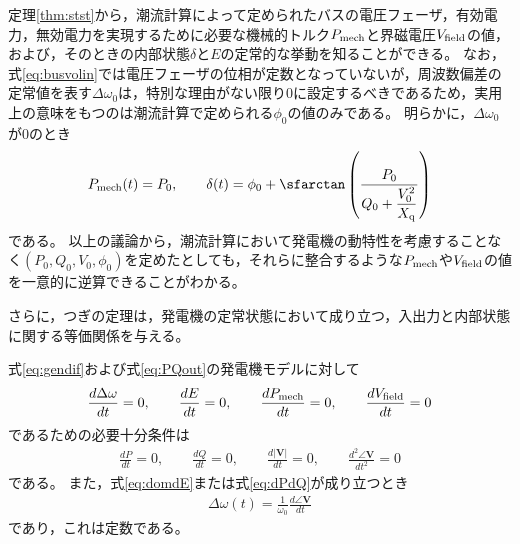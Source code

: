 \documentclass[tombow,dvipdfmx]{corona-a5}
\begin{document}
定理\ref{thm:stst}から，潮流計算によって定められたバスの電圧フェーザ，有効電力，無効電力を実現するために必要な機械的トルク$P_{\rm mech}$と界磁電圧$V_{\rm field}$の値，および，そのときの内部状態$\delta$と$E$の定常的な挙動を知ることができる。
なお，式\ref{eq:busvolin}では電圧フェーザの位相が定数となっていないが，周波数偏差の定常値を表す$\Delta \omega_0$は，特別な理由がない限り0に設定するべきであるため，実用上の意味をもつのは潮流計算で定められる$\phi_0$の値のみである。
明らかに，$\Delta \omega_0$が0のとき
\begin{align*}
P_{{\rm mech}}(t) =    P_0,\qquad
\delta (t)  = \phi_0
+ \sfarctan \left( \frac{P_0}{Q_0 + \frac{ V_0^2}{X_{\rm q}} } \right)
\end{align*}
である。
以上の議論から，潮流計算において発電機の動特性を考慮することなく$(P_0,Q_0,V_0,\phi_0)$を定めたとしても，それらに整合するような$P_{\rm mech}$や$V_{\rm field}$の値を一意的に逆算できることがわかる。

さらに，つぎの定理は，発電機の定常状態において成り立つ，入出力と内部状態に関する等価関係を与える。

\begin{定理}\label{thm:outst}
式\ref{eq:gendif}および式\ref{eq:PQout}の発電機モデルに対して
\begin{align}\label{eq:domdE}
\frac{d\Delta \omega}{dt}=0
,\qquad
\frac{dE}{dt}=0
,\qquad
\frac{d P_{\rm mech}}{dt}=0
,\qquad
\frac{d V_{\rm field}}{dt}=0
\end{align}
であるための必要十分条件は
\begin{align}\label{eq:dPdQ}
\frac{dP}{dt}=0
,\qquad
\frac{dQ}{dt}=0
,\qquad
\frac{d|\bm{V}|}{dt}=0
,\qquad
\frac{d^2 \angle \bm{V}}{dt^2}=0
\end{align}
である。
また，式\ref{eq:domdE}または式\ref{eq:dPdQ}が成り立つとき
\begin{align}\label{eq:frer}
\Delta \omega(t)= \frac{1}{\omega_0}\frac{d \angle \bm{V}}{dt}
\end{align}
であり，これは定数である。
\end{定理}
\end{document}
